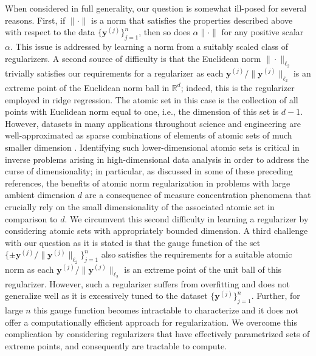 \documentclass[11pt,letterpaper]{article}
\newcommand{\R}{\mathbb{R}}
\newcommand{\by}{\mathbf{y}}
\begin{document}

When considered in full generality, our question is somewhat ill-posed for several reasons.  First, if $\|\cdot\|$ is a norm that satisfies the properties described above with respect to the data $\{\by^{(j)}\}_{j=1}^n$, then so does $\alpha \|\cdot\|$ for any positive scalar $\alpha$.  This issue is addressed by learning a norm from a suitably scaled class of regularizers.  A second source of difficulty is that the Euclidean norm $\|\cdot\|_{\ell_2}$ trivially satisfies our requirements for a regularizer as each $\by^{(j)} / \|\by^{(j)}\|_{\ell_2}$ is an extreme point of the Euclidean norm ball in $\R^d$; indeed, this is the regularizer employed in ridge regression.  The atomic set in this case is the collection of all points with Euclidean norm equal to one, i.e., the dimension of this set is $d-1$.  However, datasets in many applications throughout science and engineering are well-approximated as sparse combinations of elements of atomic sets of much smaller dimension \cite{Bar:93,BDE:09,CRPW:12,DevTem:96,Jon:92,OlsFie:96,Pis:81}.  Identifying such lower-dimensional atomic sets is critical in inverse problems arising in high-dimensional data analysis in order to address the curse of dimensionality; in particular, as discussed in some of these preceding references, the benefits of atomic norm regularization in problems with large ambient dimension $d$ are a consequence of measure concentration phenomena that crucially rely on the small dimensionality of the associated atomic set in comparison to $d$.  We circumvent this second difficulty in learning a regularizer by considering atomic sets with appropriately bounded dimension.  A third challenge with our question as it is stated is that the gauge function of the set $\{\pm \by^{(j)} / \|\by^{(j)}\|_{\ell_2}\}_{j=1}^n$ also satisfies the requirements for a suitable atomic norm as each $\by^{(j)} / \|\by^{(j)}\|_{\ell_2}$ is an extreme point of the unit ball of this regularizer.  However, such a regularizer suffers from overfitting and does not generalize well as it is excessively tuned to the dataset $\{\by^{(j)}\}_{j=1}^n$.  Further, for large $n$ this gauge function becomes intractable to characterize and it does not offer a computationally efficient approach for regularization.  We overcome this complication by considering regularizers that have effectively parametrized sets of extreme points, and consequently are tractable to compute.
\end{document}
